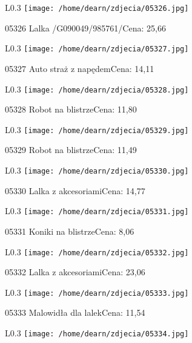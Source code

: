 \begin{wrapfigure}{L}{0.3\textwidth}
\texttt{[image: /home/dearn/zdjecia/05326.jpg]}
\end{wrapfigure}
05326 Lalka /G090049/985761/Cena: 25,66\newline
\begin{wrapfigure}{L}{0.3\textwidth}
\texttt{[image: /home/dearn/zdjecia/05327.jpg]}
\end{wrapfigure}
05327 Auto straż z napędemCena: 14,11\newline
\begin{wrapfigure}{L}{0.3\textwidth}
\texttt{[image: /home/dearn/zdjecia/05328.jpg]}
\end{wrapfigure}
05328 Robot na blistrzeCena: 11,80\newline
\begin{wrapfigure}{L}{0.3\textwidth}
\texttt{[image: /home/dearn/zdjecia/05329.jpg]}
\end{wrapfigure}
05329 Robot na blistrzeCena: 11,49\newline
\begin{wrapfigure}{L}{0.3\textwidth}
\texttt{[image: /home/dearn/zdjecia/05330.jpg]}
\end{wrapfigure}
05330 Lalka z akcesoriamiCena: 14,77\newline
\begin{wrapfigure}{L}{0.3\textwidth}
\texttt{[image: /home/dearn/zdjecia/05331.jpg]}
\end{wrapfigure}
05331 Koniki na blistrzeCena: 8,06\newline
\begin{wrapfigure}{L}{0.3\textwidth}
\texttt{[image: /home/dearn/zdjecia/05332.jpg]}
\end{wrapfigure}
05332 Lalka z akcesoriamiCena: 23,06\newline
\begin{wrapfigure}{L}{0.3\textwidth}
\texttt{[image: /home/dearn/zdjecia/05333.jpg]}
\end{wrapfigure}
05333 Malowidła dla lalekCena: 11,54\newline
\begin{wrapfigure}{L}{0.3\textwidth}
\texttt{[image: /home/dearn/zdjecia/05334.jpg]}
\end{wrapfigure}
